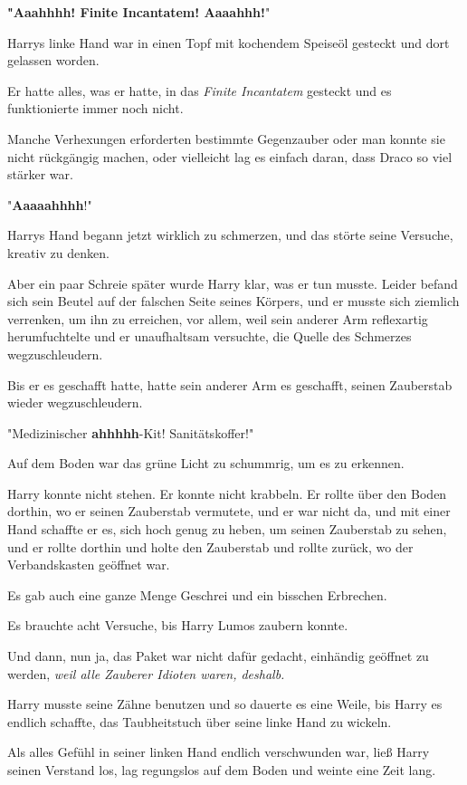 {\textbf{"Aaahhhh! Finite Incantatem! Aaaahhh!}"

Harrys linke Hand war in einen Topf mit kochendem Speiseöl gesteckt und dort gelassen worden.

Er hatte alles, was er hatte, in das \emph{Finite Incantatem} gesteckt und es funktionierte immer noch nicht.

Manche Verhexungen erforderten bestimmte Gegenzauber oder man konnte sie nicht rückgängig machen, oder vielleicht lag es einfach daran, dass Draco so viel stärker war.

"\textbf{Aaaaahhhh}!"

Harrys Hand begann jetzt wirklich zu schmerzen, und das störte seine Versuche, kreativ zu denken.

Aber ein paar Schreie später wurde Harry klar, was er tun musste. Leider befand sich sein Beutel auf der falschen Seite seines Körpers, und er musste sich ziemlich verrenken, um ihn zu erreichen, vor allem, weil sein anderer Arm reflexartig herumfuchtelte und er unaufhaltsam versuchte, die Quelle des Schmerzes wegzuschleudern.

Bis er es geschafft hatte, hatte sein anderer Arm es geschafft, seinen Zauberstab wieder wegzuschleudern.

"Medizinischer \textbf{ahhhhh}-Kit! Sanitätskoffer!"

Auf dem Boden war das grüne Licht zu schummrig, um es zu erkennen.

Harry konnte nicht stehen. Er konnte nicht krabbeln. Er rollte über den Boden dorthin, wo er seinen Zauberstab vermutete, und er war nicht da, und mit einer Hand schaffte er es, sich hoch genug zu heben, um seinen Zauberstab zu sehen, und er rollte dorthin und holte den Zauberstab und rollte zurück, wo der Verbandskasten geöffnet war.

Es gab auch eine ganze Menge Geschrei und ein bisschen Erbrechen.

Es brauchte acht Versuche, bis Harry Lumos zaubern konnte.

Und dann, nun ja, das Paket war nicht dafür gedacht, einhändig geöffnet zu werden, \emph{weil alle Zauberer Idioten waren, deshalb.}

Harry musste seine Zähne benutzen und so dauerte es eine Weile, bis Harry es endlich schaffte, das Taubheitstuch über seine linke Hand zu wickeln.

Als alles Gefühl in seiner linken Hand endlich verschwunden war, ließ Harry seinen Verstand los, lag regungslos auf dem Boden und weinte eine Zeit lang.

}
